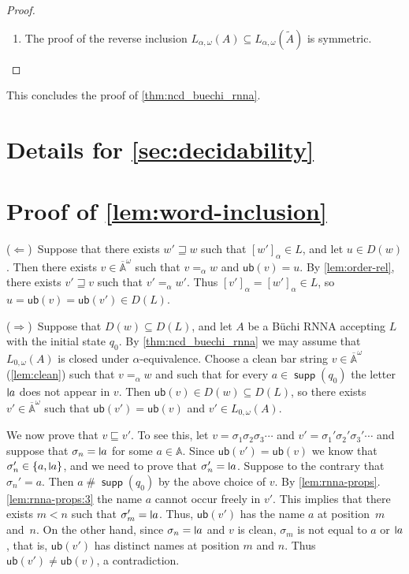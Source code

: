 \documentclass[final,a4paper,UKenglish,thm-restate,autoref,numberwithinsect]{lipics-v2021}
\newcommand{\midmid}{\hspace{0.2ex}{\rule[-0.1ex]{0.6pt}{1.65ex}}\hspace{0.2ex}}
\newcommand{\newletter}[1]{{\midmid}#1}
\newcommand{\barA}{\overline{\names}}
\newcommand{\ub}{\mathsf{ub}}
\numberwithin{equation}{section}
\newcommand{\seq}{\subseteq}
\newcommand{\tl}{\widetilde}
\newcommand{\+}[1]{\mathcal{#1}\xspace}
\newcommand{\names}{\mathbb{A}}
\DeclareMathOperator{\supp}{\mathsf{supp}} %
\newcommand{\fresh}{\mathbin{\#}}
\theoremstyle{definition}
\begin{document}
\begin{proof}
\begin{enumerate}
  \item The proof of the reverse inclusion
    $L_{\alpha,\omega}(A)\seq L_{\alpha,\omega}(\tl{A})$ is
    symmetric.\qedhere
  \end{enumerate}
\end{proof}

This concludes the proof of \autoref{thm:ncd_buechi_rnna}.

\section{Details for \autoref{sec:decidability}}

\section*{Proof of \autoref{lem:word-inclusion}}
  ($\Leftarrow$)~Suppose that there exists
  $w'\sqsupseteq w$ such that $[w']_\alpha\in L$, and let $u\in
  D(w)$. Then there exists $v\in \barA^\omega$ such that $v=_\alpha w$
  and $\ub(v)=u$. By \autoref{lem:order-rel}, there exists
  $v'\sqsupseteq v$ such that $v'=_\alpha w'$. Thus
  $[v']_\alpha = [w']_\alpha\in L$, so $u=\ub(v)=\ub(v')\in D(L)$.

  \smallskip\noindent ($\Rightarrow$)~Suppose that $D(w)\seq D(L)$,
  and let $A$ be a Büchi RNNA accepting $L$ with the initial state
  $q_0$. By \autoref{thm:ncd_buechi_rnna} we may assume that
  $L_{0,\omega}(A)$ is closed under $\alpha$-equivalence. Choose a
  clean bar string $v\in \barA^\omega$ (\autoref{lem:clean}) such that
  $v=_\alpha w$ and such that for every $a\in \supp(q_0)$ the
  letter $\newletter a$ does not appear in $v$.  Then
  $\ub(v)\in D(w)\seq D(L)$, so there exists $v'\in \barA^\omega$ such
  that $\ub(v')=\ub(v)$ and $v'\in L_{0,\omega}(A)$.

  We now prove that $v\sqsubseteq v'$. To see this, let
  $v=\sigma_1\sigma_2\sigma_3\cdots$ and
  $v'=\sigma_1'\sigma_2'\sigma_3'\cdots$ and suppose that
  $\sigma_n=\newletter a$ for some $a\in \names$. Since
  $\ub(v')=\ub(v)$ we know that $\sigma_n'\in \{a,\newletter a\}$, and
  we need to prove that $\sigma_n'=\newletter a$. Suppose to the
  contrary that $\sigma_n'=a$. Then $a\fresh \supp(q_0)$ by the above
  choice of $v$. By \autoref{lem:rnna-props}.\ref{lem:rnna-props:3}
  the name $a$ cannot occur freely in $v'$. This implies that there
  exists $m<n$ such that $\sigma'_m=\newletter a$. Thus, $\ub(v')$ has
  the name $a$ at position~$m$ and~$n$. On the other hand, since
  $\sigma_n=\newletter a$ and $v$ is clean, $\sigma_m$ is not equal to
  $a$ or $\newletter a$, that is, $\ub(v')$ has distinct names at
  position $m$ and $n$. Thus $\ub(v')\neq \ub(v)$, a
  contradiction. %
\end{document}
